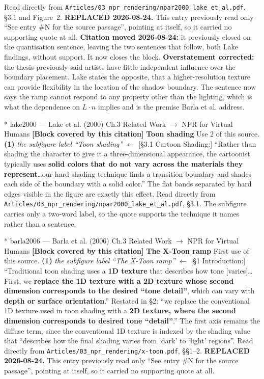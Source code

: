 \documentclass[11pt, a4paper]{article}
\makeatletter
\newcounter{citentry}
\newcommand{\citentry@core}[7]{%
  \stepcounter{citentry}
  \begingroup
  \sbox{\citentry@measurebox}{%
    \begin{minipage}{\linewidth}
      \noindent\colorbox{konstanzblue}{\parbox{\dimexpr\linewidth-2\fboxsep}{%
        \vspace{3pt}
        \textbf{\#\thecitentry \quad #2} \hfill \textit{#3}
        \vspace{3pt}
      }}
      \vspace{3pt}
      \noindent\begin{tabular}{@{}p{2.7cm} p{\dimexpr\linewidth-3cm}@{}}
        \textit{\small Sentence in thesis:} & #4 \\[5pt]
        \textbf{Usage:}\hfill       & #5 \\[5pt]
        \textit{\small Original source:}     & #6 \\[5pt]
        \textbf{How to check:}             & #7 \\
      \end{tabular}
      \vspace{5pt}
      \rule{10pt}{10pt}\quad \textbf{Validated} --- I have read the original and agree it supports the sentence.
    \end{minipage}%
  }%
  \Needspace{\dimexpr\ht\citentry@measurebox+\dp\citentry@measurebox\relax}%
  \endgroup
  \vspace{10pt}
  \noindent\colorbox{konstanzblue}{\parbox{\dimexpr\linewidth-2\fboxsep}{%
    \vspace{3pt}
    \textcolor{white}{\textbf{\#\thecitentry \quad #2}} \hfill \textcolor{white}{\textit{#3}}
    \vspace{3pt}
  }}
  \vspace{3pt}
  \noindent\begin{tabular}{@{}p{2.7cm} p{\dimexpr\linewidth-3cm}@{}}
    \textit{\small Sentence in thesis:} & \textcolor{darkgreen}{#4} \\[5pt]
    \textbf{Usage:}\hfill       & #5 \\[5pt]
    \textit{\small Original source:}     & \textcolor{darkred}{#6} \\[5pt]
    \textbf{How to check:}             & #7 \\
  \end{tabular}
  \vspace{5pt}
  \noindent\CheckBox[name=verified\thecitentry, width=10pt, height=10pt, bordercolor={0 0 0}, borderwidth=0.75, backgroundcolor={1 1 1}#1]{}\quad \textbf{Validated} --- I have read the original and agree it supports the sentence.
  \vspace{3pt}
  \noindent\textcolor{midgray}{\rule{\linewidth}{0.4pt}}
}
\newcommand{\citentry}{\@ifstar{\citentry@core{, checked}}{\citentry@core{}}}
\makeatother
\begin{document}
\begin{Form}
  {Read directly from \texttt{\footnotesize Articles/03\_npr\_rendering/npar2000\_lake\_et\_al.pdf}, \S3.1 and Figure~2. \textbf{REPLACED 2026-08-24.} This entry previously read only ``See entry \#N for the source passage'', pointing at itself, so it carried no supporting quote at all. \textbf{Citation moved 2026-08-24:} it previously closed on the quantisation sentence, leaving the two sentences that follow, both Lake findings, without support. It now closes the block. \textbf{Overstatement corrected:} the thesis previously said artists have little independent influence over the boundary placement. Lake states the opposite, that a higher-resolution texture can provide flexibility in the location of the shadow boundary. The sentence now says the ramp cannot respond to any property other than the lighting, which is what the dependence on $L\cdot n$ implies and is the premise Barla et al. address.}

\citentry*
  {lake2000 --- Lake et al. (2000)}
  {Ch.3 Related Work $\rightarrow$ NPR for Virtual Humans}
  {\textbf{[Block covered by this citation]} \textbf{Toon shading}}
  {Use 2 of this source.}
  {\textbf{(1)} \emph{the subfigure label ``Toon shading''} $\leftarrow$ [\S3.1 Cartoon Shading:] ``Rather than shading the character to give it a three-dimensional appearance, the cartoonist typically uses \textbf{solid colors that do not vary across the materials they represent}\ldots our hard shading technique finds a transition boundary and shades each side of the boundary with a solid color.'' The flat bands separated by hard edges visible in the figure are exactly this effect.}
  {Read directly from \texttt{\footnotesize Articles/03\_npr\_rendering/npar2000\_lake\_et\_al.pdf}, \S3.1. The subfigure carries only a two-word label, so the quote supports the technique it names rather than a sentence.}

\citentry*
  {barla2006 --- Barla et al. (2006)}
  {Ch.3 Related Work $\rightarrow$ NPR for Virtual Humans}
  {\textbf{[Block covered by this citation]} \textbf{The X-Toon ramp}}
  {First use of this source.}
  {\textbf{(1)} \emph{the subfigure label ``The X-Toon ramp''} $\leftarrow$ [\S1 Introduction:] ``Traditional toon shading uses a \textbf{1D texture} that describes how tone [varies]\ldots First, we \textbf{replace the 1D texture with a 2D texture whose second dimension corresponds to the desired ``tone detail''}, which can vary with \textbf{depth or surface orientation}.'' Restated in \S2: ``we replace the conventional 1D texture used in toon shading with a \textbf{2D texture, where the second dimension corresponds to desired tone ``detail''}.'' The first axis remains the diffuse term, since the conventional 1D texture is indexed by the shading value that ``describes how the final shading varies from `dark' to `light' regions''.}
  {Read directly from \texttt{\footnotesize Articles/03\_npr\_rendering/x-toon.pdf}, \S\S1--2. \textbf{REPLACED 2026-08-24.} This entry previously read only ``See entry \#N for the source passage'', pointing at itself, so it carried no supporting quote at all.}


\end{Form}
\end{document}

